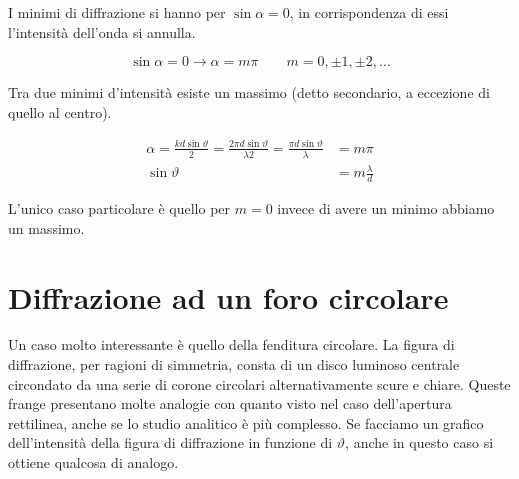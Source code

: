 \begin{figure}[htpb]
\end{figure}
\FloatBarrier

I minimi di diffrazione si hanno per $\sin \alpha =0$, in corrispondenza di essi l'intensità dell'onda si annulla.

\[
	\sin \alpha =0 \to \alpha =m\pi \qquad m=0,\pm 1,\pm 2,\ldots
\]

Tra due minimi d'intensità esiste un massimo (detto secondario, a eccezione di quello al centro).

\begin{align*}
	\alpha =\frac{kd\sin \vartheta}{2}= \frac{2\pi d\sin \vartheta}{\lambda 2} = \frac{\pi d\sin \vartheta}{\lambda} &= m \pi \\
	\sin \vartheta &= m\frac{\lambda}{d}
\end{align*}

L'unico caso particolare è quello per $m=0$ invece di avere un minimo abbiamo un massimo.

\section{Diffrazione ad un foro circolare}

Un caso molto interessante è quello della fenditura circolare. La figura di diffrazione, per ragioni di simmetria, consta di un disco luminoso centrale circondato da una serie di corone circolari alternativamente scure e chiare. Queste frange presentano molte analogie con quanto visto nel caso dell'apertura rettilinea, anche se lo studio analitico è più complesso. Se facciamo un grafico dell'intensità della figura di diffrazione in funzione di $\vartheta$, anche in questo caso si ottiene qualcosa di analogo.


